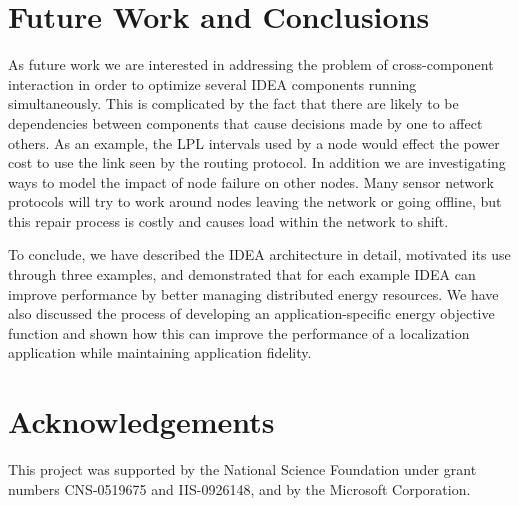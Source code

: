 \documentclass{sig-alternate}
\begin{document}
\section{Future Work and Conclusions}
\label{sec-futurework}

As future work we are interested in addressing the problem of cross-component
interaction in order to optimize several IDEA components running
simultaneously. This is complicated by the fact that there are likely to be
dependencies between components that cause decisions made by one to affect
others. As an example, the LPL intervals used by a node would effect the
power cost to use the link seen by the routing protocol. In addition we are
investigating ways to model the impact of node failure on other nodes. Many
sensor network protocols will try to work around nodes leaving the network or
going offline, but this repair process is costly and causes load within the
network to shift.

To conclude, we have described the IDEA architecture in detail, motivated its
use through three examples, and demonstrated that for each example IDEA can
improve performance by better managing distributed energy resources. We have
also discussed the process of developing an application-specific energy
objective function and shown how this can improve the performance of a
localization application while maintaining application fidelity. 

\section{Acknowledgements}

This project was supported by the National Science Foundation under grant
numbers CNS-0519675 and IIS-0926148, and by the Microsoft Corporation.
\end{document}
